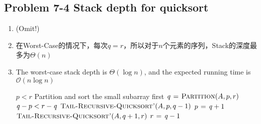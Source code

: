 \subsection*{Problem 7-4 Stack depth for quicksort}
\begin{enumerate}
	\item	(Omit!)
	\item	在Worst-Case的情况下，每次$q = r$，所以对于$n$个元素的序列，Stack的深度最多为$\Theta(n)$
	\item	The worst-case stack depth is $\Theta(\log n)$, and the expected running time is $\mathcal{O}(n \log n)$
		\begin{codebox}
		\li	\While $p < r$
		\li	\Do
				\Comment Partition and sort the small subarray first
		\li		$\id{q} \gets \proc{Partition}(A, p, r)$
		\li		\If $\id{q} - p < r - \id{q}$
		\li		\Then
					$\textnormal{\scshape Tail-Recursive-Quicksort'}(A, p, q - 1)$
		\li			$p \gets \id{q} + 1$
		\li		\ElseNoIf
					$\textnormal{\scshape Tail-Recursive-Quicksort'}(A, q + 1, r)$
		\li			$r \gets \id{q} - 1$
				\End
			\End
		\end{codebox}
\end{enumerate}

